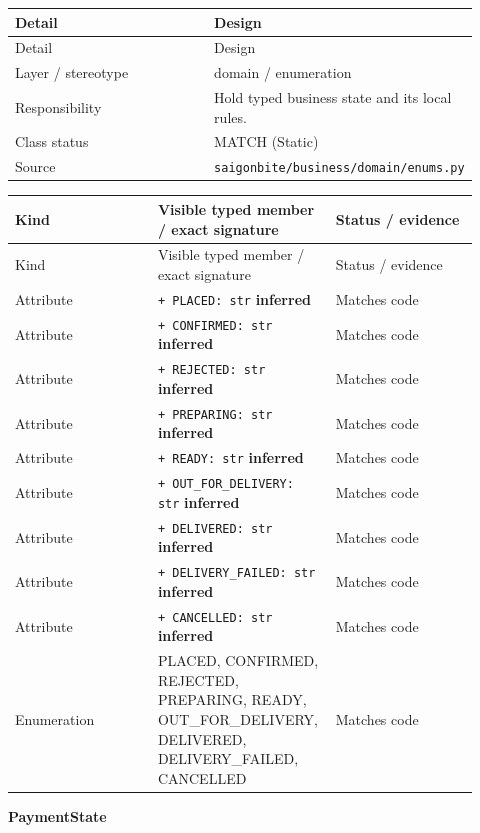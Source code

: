 \begin{longtable}{>{\raggedright\arraybackslash}p{0.4600\linewidth}>{\raggedright\arraybackslash}p{0.4600\linewidth}}
Detail & Design \\
\hline\endfirsthead
Detail & Design \\
\hline\endhead
Layer / stereotype & domain / \guillemotleft{}enumeration\guillemotright{} \\
Responsibility & Hold typed business state and its local rules. \\
Class status & MATCH (Static) \\
Source & \texttt{saigonbite/\allowbreak{}business/\allowbreak{}domain/\allowbreak{}enums.\allowbreak{}py} \\
\end{longtable}
\begin{longtable}{>{\raggedright\arraybackslash}p{0.3067\linewidth}>{\raggedright\arraybackslash}p{0.3067\linewidth}>{\raggedright\arraybackslash}p{0.3067\linewidth}}
Kind & Visible typed member / exact signature & Status / evidence \\
\hline\endfirsthead
Kind & Visible typed member / exact signature & Status / evidence \\
\hline\endhead
Attribute & \texttt{+ PLACED: str} \textbf{inferred} & Matches code \\
Attribute & \texttt{+ CONFIRMED: str} \textbf{inferred} & Matches code \\
Attribute & \texttt{+ REJECTED: str} \textbf{inferred} & Matches code \\
Attribute & \texttt{+ PREPARING: str} \textbf{inferred} & Matches code \\
Attribute & \texttt{+ READY: str} \textbf{inferred} & Matches code \\
Attribute & \texttt{+ OUT\_\allowbreak{}FOR\_\allowbreak{}DELIVERY: str} \textbf{inferred} & Matches code \\
Attribute & \texttt{+ DELIVERED: str} \textbf{inferred} & Matches code \\
Attribute & \texttt{+ DELIVERY\_\allowbreak{}FAILED: str} \textbf{inferred} & Matches code \\
Attribute & \texttt{+ CANCELLED: str} \textbf{inferred} & Matches code \\
Enumeration & PLACED, CONFIRMED, REJECTED, PREPARING, READY, OUT\_FOR\_DELIVERY, DELIVERED, DELIVERY\_FAILED, CANCELLED & Matches code \\
\end{longtable}
\textbf{PaymentState}

